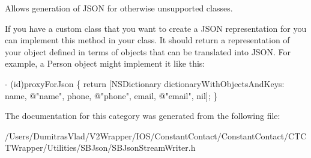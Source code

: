 Allows generation of J\-S\-O\-N for otherwise unsupported classes. 

If you have a custom class that you want to create a J\-S\-O\-N representation for you can implement this method in your class. It should return a representation of your object defined in terms of objects that can be translated into J\-S\-O\-N. For example, a Person object might implement it like this\-:


\begin{DoxyCode}
- (id)proxyForJson \{
   \textcolor{keywordflow}{return} [NSDictionary dictionaryWithObjectsAndKeys:
   name, \textcolor{stringliteral}{@"name"},
   phone, \textcolor{stringliteral}{@"phone"},
   email, \textcolor{stringliteral}{@"email"},
   nil];
\}
\end{DoxyCode}
 

The documentation for this category was generated from the following file\-:\begin{DoxyCompactItemize}
\item 
/\-Users/\-Dumitras\-Vlad/\-V2\-Wrapper/\-I\-O\-S/\-Constant\-Contact/\-Constant\-Contact/\-C\-T\-C\-T\-Wrapper/\-Utilities/\-S\-B\-Json/S\-B\-Json\-Stream\-Writer.\-h\end{DoxyCompactItemize}
